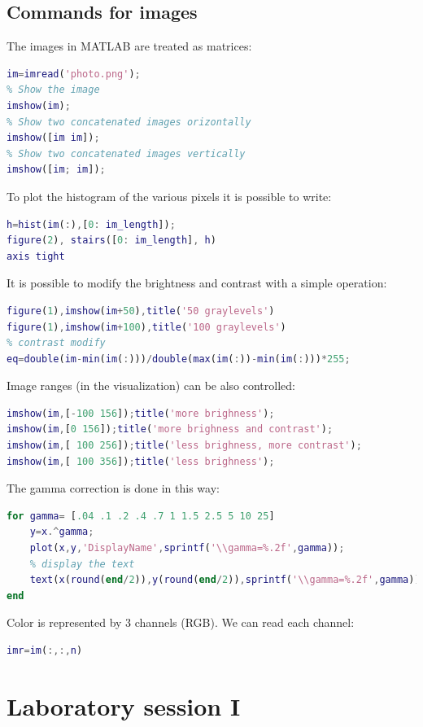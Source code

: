 \documentclass[12pt, a4paper]{report}
\newtheorem[style=M,bodystyle=\normalfont]{theorem}{Theorem}
\newtheorem[style=M,bodystyle=\normalfont]{corollary}{Corollary}
\newtheorem[style=M,bodystyle=\normalfont]{lemma}{Lemma}
\newtheorem[style=M,bodystyle=\normalfont]{definition}{Definition}
\begin{document}
    \section{Commands for images}
    The images in MATLAB are treated as matrices:
    \begin{lstlisting}[language=Matlab]
im=imread('photo.png');
% Show the image
imshow(im);
% Show two concatenated images orizontally
imshow([im im]);
% Show two concatenated images vertically
imshow([im; im]);
    \end{lstlisting}
    To plot the histogram of the various pixels it is possible to write: 
    \begin{lstlisting}[language=Matlab]
h=hist(im(:),[0: im_length]);
figure(2), stairs([0: im_length], h)
axis tight
    \end{lstlisting}
    It is possible to modify the brightness and contrast with a simple operation:
    \begin{lstlisting}[language=Matlab]
figure(1),imshow(im+50),title('50 graylevels')
figure(1),imshow(im+100),title('100 graylevels')
% contrast modify
eq=double(im-min(im(:)))/double(max(im(:))-min(im(:)))*255;
    \end{lstlisting}
    Image ranges (in the visualization) can be also controlled:
    \begin{lstlisting}[language=Matlab]
imshow(im,[-100 156]);title('more brighness');
imshow(im,[0 156]);title('more brighness and contrast');
imshow(im,[ 100 256]);title('less brighness, more contrast');
imshow(im,[ 100 356]);title('less brighness');
    \end{lstlisting}
    The gamma correction is done in this way: 
    \begin{lstlisting}[language=Matlab]
for gamma= [.04 .1 .2 .4 .7 1 1.5 2.5 5 10 25]
    y=x.^gamma;
    plot(x,y,'DisplayName',sprintf('\\gamma=%.2f',gamma));
    % display the text
    text(x(round(end/2)),y(round(end/2)),sprintf('\\gamma=%.2f',gamma));
end
    \end{lstlisting}
    Color is represented by 3 channels (RGB). We can read each channel:
    \begin{lstlisting}[language=Matlab]
% n=1 for red, n=2 for green, and n=3 for blue
imr=im(:,:,n)
    \end{lstlisting}

    \newpage

\chapter{Laboratory session I}
\end{document}
